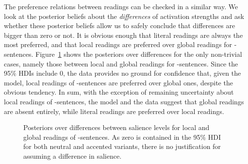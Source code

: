 \documentclass[fleqn,reqno,10pt]{article}
\newcommand{\as}{\acro{as}}
\renewcommand{\es}{\acro{es}}
\begin{document}
The preference relations between readings can be checked in a similar
way. We look at the posterior beliefs about the \emph{differences} of
activation strengths and ask whether these posterior beliefs allow us
to safely conclude that differences are bigger than zero or not. It is
obvious enough that literal readings are always the most preferred,
and that local readings are preferred over global readings for
\es-sentences. Figure~\ref{fig:PostDiffTAS} shows the posteriors over
differences for the only non-trivial cases, namely those between local
and global readings for \as-sentences. Since the 95\% HDIs include 0,
the data provides no ground for confidence that, given the model,
local readings of \as-sentences are preferred over global ones,
despite the obvious tendency. In sum, with the exception of remaining
uncertainty about local readings of \as-sentences, the model and the
data suggest that global readings are absent entirely, while literal
readings are preferred over local readings.

\begin{figure}
  \centering
  \hfill
  \caption{Posteriors over differences between salience levels for
    local and global readings of \as-sentences. As zero is contained
    in the 95\% HDI for both neutral and accented variants, there is
    no justification for assuming a difference in salience.}
  \label{fig:PostDiffTAS}
\end{figure}
\end{document}
